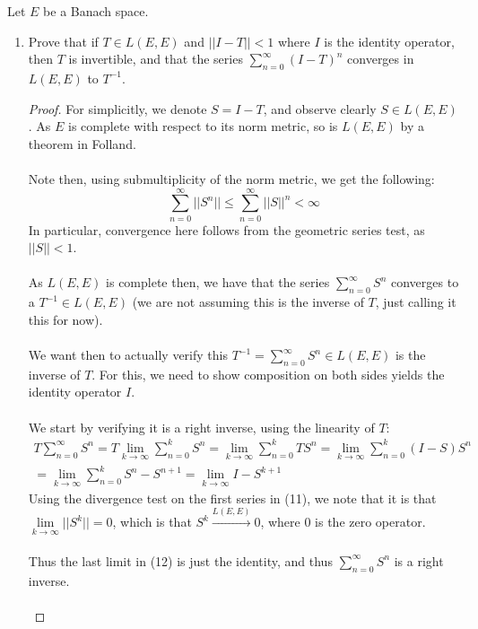 \documentclass[12pt]{article}
\newenvironment{ex}[2][Exercise]{\begin{trivlist}
\item[\hskip \labelsep {\bfseries #1}\hskip \labelsep {\bfseries #2.}]}{\end{trivlist}}
\begin{document}
\begin{ex}{5}
    Let $E$ be a Banach space.
    \begin{enumerate}[label=(\alph*)]
        \item Prove that if $T \in L(E,E)$ and $||I - T|| < 1$ where $I$ is the identity operator, then $T$ is invertible, and that the series $\sum_{n = 0}^\infty (I - T)^n$ converges in $L(E,E)$ to $T^{-1}$.
        \begin{proof}
            For simplicitly, we denote $S = I - T$, and observe clearly $S \in L(E,E)$. As $E$ is complete with respect to its norm metric, so is $L(E,E)$ by a theorem in Folland. \\ \\
            Note then, using submultiplicity of the norm metric, we get the following:
            \begin{equation}
                \sum_{n = 0}^\infty ||S^n|| \leq \sum_{n = 0}^\infty ||S||^n < \infty
            \end{equation}
            In particular, convergence here follows from the geometric series test, as $||S|| < 1$.\\ \\ As $L(E,E)$ is complete then, we have that the series $\sum_{n = 0}^\infty S^n$ converges to a $T^{-1} \in L(E,E)$ (we are not assuming this is the inverse of $T$, just calling it this for now). \\ \\
            We want then to actually verify this $T^{-1} = \sum_{n = 0}^\infty S^n \in L(E,E)$ is the inverse of $T$. For this, we need to show composition on both sides yields the identity operator $I$. \\ \\
            We start by verifying it is a right inverse, using the linearity of $T$:
            \begin{equation}
                \begin{aligned}
                T\sum_{n = 0}^\infty S^n = T\underset{k \rightarrow \infty}{\lim} \sum_{n = 0}^k S^n = \underset{k \rightarrow \infty}{\lim} \sum_{n = 0}^k TS^n = \underset{k \rightarrow \infty}{\lim} \sum_{n = 0}^k (I - S)S^n \\
                = \underset{k \rightarrow \infty}{\lim} \sum_{n = 0}^k S^n - S^{n + 1} = \underset{k \rightarrow \infty}{\lim} I - S^{k + 1}
                \end{aligned}
            \end{equation}
            Using the divergence test on the first series in (11), we note that it is that $\underset{k \rightarrow \infty}{\lim} ||S^k|| = 0$, which is that $S^k \xrightarrow{L(E,E)} 0$, where $0$ is the zero operator. \\ \\Thus the last limit in (12) is just the identity, and thus $\sum_{n = 0}^\infty S^n$ is a right inverse. \\ \\

\end{proof}
\end{enumerate}
\end{ex}
\end{document}
